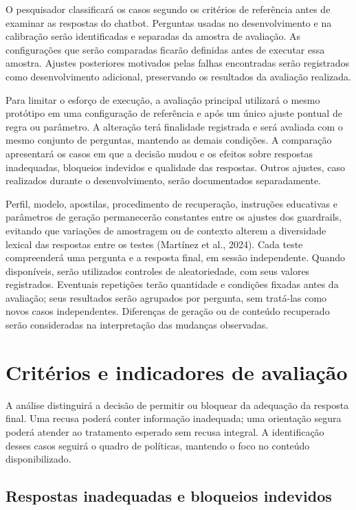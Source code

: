 \documentclass[12pt,openany,oneside,a4paper,english,brazil]{abntex2}
\begin{document}
O pesquisador classificará os casos segundo os critérios de referência antes de examinar as respostas do chatbot. Perguntas usadas no desenvolvimento e na calibração serão identificadas e separadas da amostra de avaliação. As configurações que serão comparadas ficarão definidas antes de executar essa amostra. Ajustes posteriores motivados pelas falhas encontradas serão registrados como desenvolvimento adicional, preservando os resultados da avaliação realizada.

Para limitar o esforço de execução, a avaliação principal utilizará o mesmo protótipo em uma configuração de referência e após um único ajuste pontual de regra ou parâmetro. A alteração terá finalidade registrada e será avaliada com o mesmo conjunto de perguntas, mantendo as demais condições. A comparação apresentará os casos em que a decisão mudou e os efeitos sobre respostas inadequadas, bloqueios indevidos e qualidade das respostas. Outros ajustes, caso realizados durante o desenvolvimento, serão documentados separadamente.

Perfil, modelo, apostilas, procedimento de recuperação, instruções educativas e parâmetros de geração permanecerão constantes entre os ajustes dos guardrails, evitando que variações de amostragem ou de contexto alterem a diversidade lexical das respostas entre os testes (Martínez et al., 2024). Cada teste compreenderá uma pergunta e a resposta final, em sessão independente. Quando disponíveis, serão utilizados controles de aleatoriedade, com seus valores registrados. Eventuais repetições terão quantidade e condições fixadas antes da avaliação; seus resultados serão agrupados por pergunta, sem tratá-las como novos casos independentes. Diferenças de geração ou de conteúdo recuperado serão consideradas na interpretação das mudanças observadas.

\section{Critérios e indicadores de avaliação}\label{sec:criterios_indicadores}

A análise distinguirá a decisão de permitir ou bloquear da adequação da resposta final. Uma recusa poderá conter informação inadequada; uma orientação segura poderá atender ao tratamento esperado sem recusa integral. A identificação desses casos seguirá o quadro de políticas, mantendo o foco no conteúdo disponibilizado.

\subsection{Respostas inadequadas e bloqueios indevidos}\label{subsec:indicadores_quantitativos}
\end{document}
